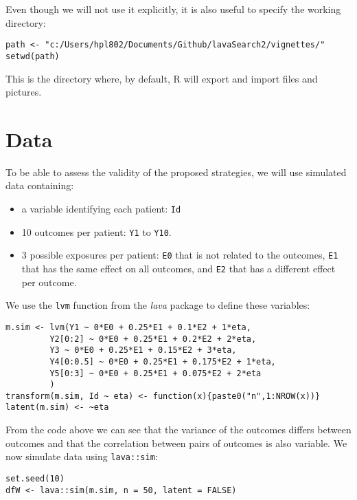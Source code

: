 \documentclass{article}
\begin{document}
Even though we will not use it explicitly, it is also useful to
specify the working directory:
\lstset{language=r,label= ,caption= ,captionpos=b,numbers=none}
\begin{lstlisting}
path <- "c:/Users/hpl802/Documents/Github/lavaSearch2/vignettes/"
setwd(path)
\end{lstlisting}

This is the directory where, by default, R will export and import
files and pictures.

\clearpage

\section{Data}
\label{sec:org429d16e}

To be able to assess the validity of the proposed strategies, we will
use simulated data containing:
\begin{itemize}
\item a variable identifying each patient: \texttt{Id}
\item 10 outcomes per patient: \texttt{Y1} to \texttt{Y10}.
\item 3 possible exposures per patient: \texttt{E0} that is not related to the outcomes, \texttt{E1}
that has the same effect on all outcomes, and \texttt{E2} that has a
different effect per outcome.
\end{itemize}
We use the \texttt{lvm} function from the \emph{lava} package to define these variables:
\lstset{language=r,label= ,caption= ,captionpos=b,numbers=none}
\begin{lstlisting}
m.sim <- lvm(Y1 ~ 0*E0 + 0.25*E1 + 0.1*E2 + 1*eta,
	     Y2[0:2] ~ 0*E0 + 0.25*E1 + 0.2*E2 + 2*eta,
	     Y3 ~ 0*E0 + 0.25*E1 + 0.15*E2 + 3*eta,
	     Y4[0:0.5] ~ 0*E0 + 0.25*E1 + 0.175*E2 + 1*eta,
	     Y5[0:3] ~ 0*E0 + 0.25*E1 + 0.075*E2 + 2*eta
	     )
transform(m.sim, Id ~ eta) <- function(x){paste0("n",1:NROW(x))}
latent(m.sim) <- ~eta
\end{lstlisting}

From the code above we can see that the variance of the outcomes
 differs between outcomes and that the correlation between pairs of
 outcomes is also variable. We now simulate data using \texttt{lava::sim}:
\lstset{language=r,label= ,caption= ,captionpos=b,numbers=none}
\begin{lstlisting}
set.seed(10)
dfW <- lava::sim(m.sim, n = 50, latent = FALSE)
\end{lstlisting}
\end{document}
